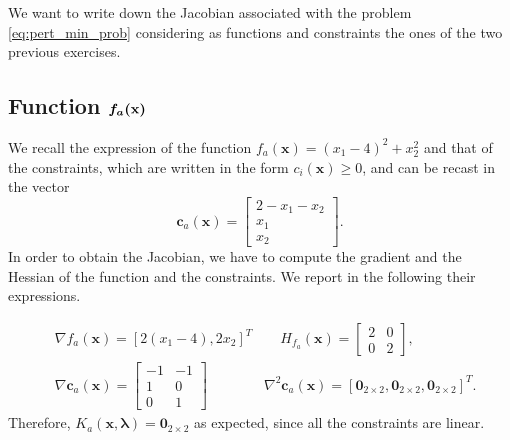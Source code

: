 \documentclass[a4paper,11pt]{article}
\begin{document}
\noindent We want to write down the Jacobian associated with the problem \eqref{eq:pert_min_prob} considering as functions and constraints the ones of the two previous exercises.

\subsection*{Function $\boldmath{f_{a}}(\textbf{x})$}
We recall the expression of the function $f_{a}(\textbf{x}) = (x_{1}-4)^2 + x_{2}^{2}$ and that of the constraints, which are written in the form $c_{i}(\textbf{x})\ge0$, and can be recast in the vector
\begin{equation}
	\textbf{c}_{a}(\textbf{x}) = 
	\begin{bmatrix}
		2 -x_{1} - x_2\\
		x_1\\
		x_2
	\end{bmatrix}.
\end{equation}
In order to obtain the Jacobian, we have to compute the gradient and the Hessian of the function and the constraints. We report in the following their expressions.

\begin{align}
	& \nabla f_{a}(\textbf{x}) = [2(x_{1}-4),2x_{2}]^{T} \qquad H_{f_{a}}(\textbf{x}) = \begin{bmatrix}
		2 & 0 \\
		0 & 2
	\end{bmatrix}, \\
	& \nabla \textbf{c}_{a}(\textbf{x}) = \begin{bmatrix}
		-1 & - 1\\
		1 & 0 \\
		0 & 1
	\end{bmatrix} \qquad \qquad \nabla^{2}{\textbf{c}_{a}}(\textbf{x}) =  \left[\textbf{0}_{2\times2},\textbf{0}_{2\times2},\textbf{0}_{2\times2}\right]^{T}.
\end{align}
Therefore, $K_{a}(\textbf{x},\boldsymbol{\lambda})=\textbf{0}_{2\times 2}$ as expected, since all the constraints are linear.
\end{document}
